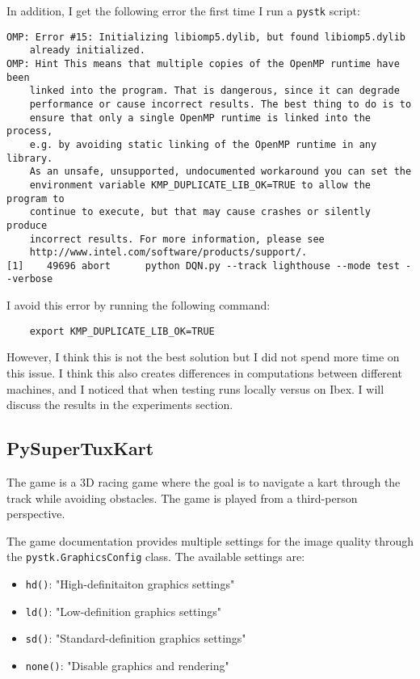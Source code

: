\documentclass{article}
\begin{document}
In addition, I get the following error the first time I run a \texttt{pystk} script:

\begin{verbatim}
OMP: Error #15: Initializing libiomp5.dylib, but found libiomp5.dylib 
    already initialized.
OMP: Hint This means that multiple copies of the OpenMP runtime have been 
    linked into the program. That is dangerous, since it can degrade 
    performance or cause incorrect results. The best thing to do is to 
    ensure that only a single OpenMP runtime is linked into the process, 
    e.g. by avoiding static linking of the OpenMP runtime in any library. 
    As an unsafe, unsupported, undocumented workaround you can set the 
    environment variable KMP_DUPLICATE_LIB_OK=TRUE to allow the program to 
    continue to execute, but that may cause crashes or silently produce 
    incorrect results. For more information, please see 
    http://www.intel.com/software/products/support/.
[1]    49696 abort      python DQN.py --track lighthouse --mode test --verbose
\end{verbatim}

I avoid this error by running the following command:

\begin{verbatim}
    export KMP_DUPLICATE_LIB_OK=TRUE
\end{verbatim}

However, I think this is not the best solution but I did not spend more time on this issue. I think this also creates
differences in computations between different machines, and I noticed that when testing runs locally versus on Ibex. 
I will discuss the results in the experiments section.

\subsection{PySuperTuxKart}

The game is a 3D racing game where the goal is to navigate a kart through the track 
while avoiding obstacles. The game is played from a third-person perspective.

The game documentation provides multiple settings for the image quality through the \texttt{pystk.GraphicsConfig}
class. The available settings are:

\begin{itemize}
    \item \texttt{hd()}: "High-definitaiton graphics settings"
    \item \texttt{ld()}: "Low-definition graphics settings"
    \item \texttt{sd()}: "Standard-definition graphics settings"
    \item \texttt{none()}: "Disable graphics and rendering"
\end{itemize}
\end{document}
